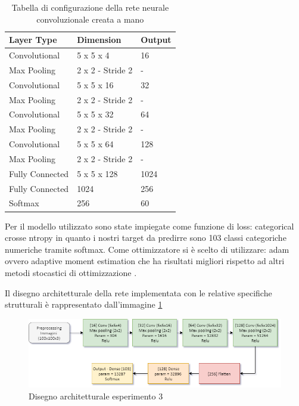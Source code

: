 \begin{table}
    \centering
    \begin{tabular}{|l|l|l|}
    \hline
    \textbf{Layer Type} & \textbf{Dimension} & \textbf{Output} \\ \hline
    Convolutional   & 5 x 5 x 4         & 16     \\ \hline
    Max Pooling     & 2 x 2 - Stride 2  & -      \\ \hline
    Convolutional   & 5 x 5 x 16        & 32     \\ \hline
    Max Pooling     & 2 x 2 - Stride 2  & -      \\ \hline
    Convolutional   & 5 x 5 x 32        & 64     \\ \hline
    Max Pooling     & 2 x 2 - Stride 2  & -      \\ \hline
    Convolutional   & 5 x 5 x 64        & 128    \\ \hline
    Max Pooling     & 2 x 2 - Stride 2  & -      \\ \hline
    Fully Connected & 5 x 5 x 128       & 1024   \\ \hline
    Fully Connected & 1024              & 256    \\ \hline
    Softmax         & 256               & 60     \\ \hline
    \end{tabular}
    \caption{\label{tab:esperimento3_configurazione}Tabella di configurazione della rete neurale convoluzionale creata a mano}
\end{table}

Per il modello utilizzato sono state impiegate come funzione di loss: categorical crosse ntropy in quanto i nostri target da predirre sono 103 classi categoriche numeriche tramite softmax. Come ottimizzatore si è scelto di utilizzare: adam ovvero adaptive moment estimation che ha risultati migliori rispetto ad altri metodi stocastici di ottimizzazione \cite{adam}.

Il disegno architetturale della rete implementata con le relative specifiche strutturali è rappresentato dall'immagine \ref{fig:architettura-esperimento3}
\begin{figure}
    \centering
    \includegraphics[width=1\textwidth]{./resources/AdvanceMachineLearningSchema-Esperimento3.png}
    \caption{Disegno architetturale esperimento 3} 
    \label{fig:architettura-esperimento3}
\end{figure}




